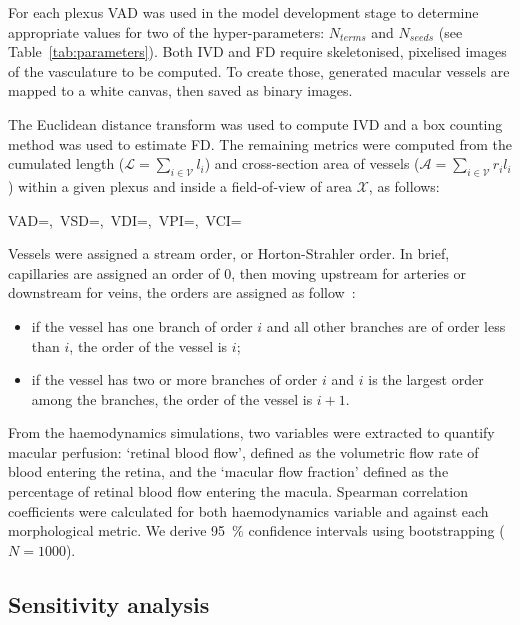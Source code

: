 \documentclass[11pt,]{article}
\let\oldequation\equation
\let\oldendequation\endequation
\renewenvironment{equation}
  {\linenomathNonumbers\oldequation}
  {\oldendequation\endlinenomath}
\begin{document}
For each plexus VAD was used in the model development stage to determine appropriate values for two of the hyper-parameters: $N_{terms}$ and $N_{seeds}$ (see Table~\ref{tab:parameters}).
Both IVD and FD require skeletonised, pixelised images of the vasculature to be computed.
To create those, generated macular vessels are mapped to a white canvas, then saved as binary images.

The Euclidean distance transform was used to compute IVD and a box counting method was used to estimate FD. The remaining metrics were computed from the cumulated length ($\mathcal L=\sum_{i\in\mathcal V} l_i$) and cross-section area of vessels ($\mathcal A=\sum_{i\in\mathcal V} r_il_i$) within a given plexus and inside a field-of-view of area $\mathcal X$,  as follows:

\begin{equation}\label{eq:OCTAmetrics}
VAD=,\ VSD=,\ VDI=,\ VPI=,\ VCI=
\end{equation}

Vessels were assigned a stream order, or Horton-Strahler order.
In brief, capillaries are assigned an order of 0, then moving upstream for arteries or downstream for veins, the orders are assigned as follow~\cite{An2020}:
\begin{itemize}
\item if the vessel has one branch of order $i$ and all other branches are of order less than $i$, the order of the vessel is $i$;
\item if the vessel has two or more branches of order $i$ and $i$ is the largest order among the branches, the order of the vessel is $i+1$.
\end{itemize}

From the haemodynamics simulations, two variables were extracted to quantify macular perfusion: `retinal blood flow', defined as the volumetric flow rate of blood entering the retina, and the `macular flow fraction' defined as the percentage of retinal blood flow entering the macula.
Spearman correlation coefficients were calculated for both haemodynamics variable and against each morphological metric.
We derive \SI{95}{\percent} confidence intervals using bootstrapping ($N=1000$).

\subsection{Sensitivity analysis}\label{sec:method-gsa}
\end{document}
